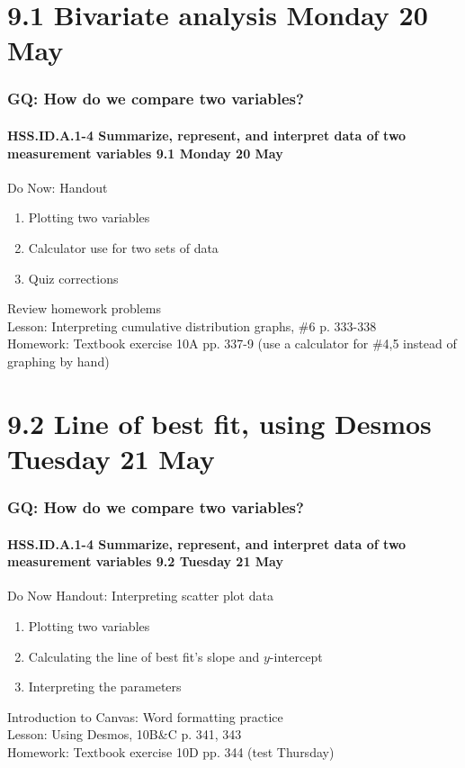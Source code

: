 \documentclass{beamer}
\begin{document}
\section{9.1 Bivariate analysis Monday 20 May}
  \frame
  {
    \frametitle{GQ: How do we compare two variables?}
    \framesubtitle{HSS.ID.A.1-4 Summarize, represent, and interpret data of two measurement variables \hfill \alert{9.1 Monday 20 May}}

    \begin{block}{Do Now: Handout}
        \begin{enumerate}
          \item Plotting two variables
          \item Calculator use for two sets of data
          \item Quiz corrections
      \end{enumerate}
    \end{block}
    Review homework problems\\
    Lesson: Interpreting cumulative distribution graphs, \#6 p. 333-338\\[0.5cm]
    Homework: Textbook exercise 10A pp. 337-9 (use a calculator for \#4,5 instead of graphing by hand)
  }

\section{9.2 Line of best fit, using Desmos Tuesday 21 May}
  \frame
  {
    \frametitle{GQ: How do we compare two variables?}
    \framesubtitle{HSS.ID.A.1-4 Summarize, represent, and interpret data of two measurement variables \hfill \alert{9.2 Tuesday 21 May}}

    \begin{block}{Do Now Handout: Interpreting scatter plot data}
        \begin{enumerate}
          \item Plotting two variables
          \item Calculating the line of best fit's slope and $y$-intercept
          \item Interpreting the parameters
      \end{enumerate}
    \end{block}
    Introduction to Canvas: Word formatting practice\\
    Lesson: Using Desmos, 10B\&C p. 341, 343\\[0.5cm]
    Homework: Textbook exercise 10D pp. 344 (\alert{test Thursday})
  }
\end{document}
